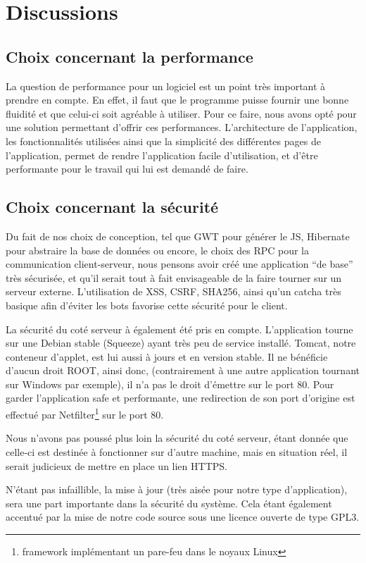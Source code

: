 \chapter{Discussions}
\section{Choix concernant la performance}
La question de performance pour un logiciel est un point très important à prendre en compte. En effet, il faut que le programme puisse fournir une bonne fluidité et que celui-ci soit agréable à utiliser. Pour ce faire, nous avons opté pour une solution permettant d'offrir ces performances. L'architecture de l'application, les fonctionnalités utilisées ainsi que la simplicité des différentes pages de l'application, permet de rendre l'application facile d'utilisation, et d'être performante pour le travail qui lui est demandé de faire.
\section{Choix concernant la sécurité}

Du fait de nos choix de conception, tel que GWT pour générer le JS, Hibernate pour abstraire la base de données ou encore, le choix des RPC pour la
communication client-serveur, nous pensons avoir créé une application \enquote{de base} très sécurisée, et qu'il serait tout à fait envisageable de la faire tourner sur un serveur externe.
L'utilisation de XSS, CSRF, SHA256, ainsi qu'un catcha très basique afin d'éviter les bots favorise cette sécurité pour le client.

La sécurité du coté serveur à également été pris en compte. L'application tourne sur une Debian stable (Squeeze) ayant très peu de service installé. Tomcat, notre conteneur d'applet, est lui aussi à jours et en version stable. Il ne bénéficie d'aucun droit ROOT, ainsi donc, (contrairement à une autre application tournant sur Windows par exemple), il n'a pas le droit d'émettre sur le port 80. Pour garder l'application safe et performante, une redirection de son port d'origine est effectué par Netfilter\footnote{framework implémentant un pare-feu dans le noyaux Linux} sur le port 80.

Nous n'avons pas poussé plus loin la sécurité du coté serveur, étant donnée que celle-ci est destinée à fonctionner sur d'autre machine, mais en situation réel, il serait judicieux de mettre en place un lien HTTPS.

N'étant pas infaillible, la mise à jour (très aisée pour notre type d'application), sera une part importante dans la sécurité du système. Cela étant également accentué par la mise de notre code source sous une licence ouverte de type GPL3.
